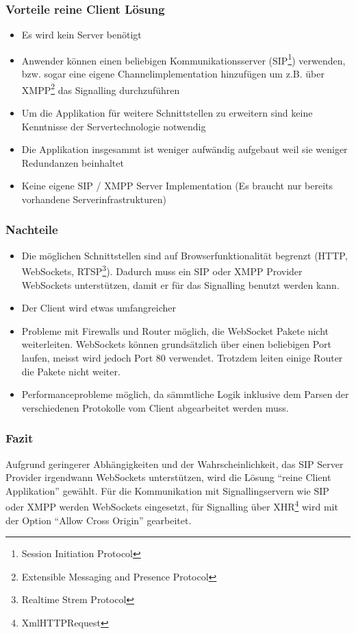 		\subsubsection{Vorteile reine Client Lösung}
		\begin{itemize}
			\item Es wird kein Server benötigt
			\item Anwender können einen beliebigen Kommunikationsserver (SIP\footnote{Session Initiation Protocol}) verwenden, bzw. sogar eine eigene Channelimplementation hinzufügen um z.B. über XMPP\footnote{Extensible Messaging and Presence Protocol} das Signalling durchzuführen
			\item Um die Applikation für weitere Schnittstellen zu erweitern sind keine Kenntnisse der Servertechnologie notwendig
			\item Die Applikation insgesammt ist weniger aufwändig aufgebaut weil sie weniger Redundanzen beinhaltet
			\item Keine eigene SIP / XMPP Server Implementation (Es braucht nur bereits vorhandene Serverinfrastrukturen)
		\end{itemize}
		\subsubsection{Nachteile}
		\begin{itemize}
			\item Die möglichen Schnittstellen sind auf Browserfunktionalität begrenzt (HTTP, WebSockets, RTSP\footnote{Realtime Strem Protocol}). Dadurch muss ein SIP oder XMPP Provider WebSockets unterstützen, damit er für das Signalling benutzt werden kann.
			\item Der Client wird etwas umfangreicher
			\item Probleme mit Firewalls und Router möglich, die WebSocket Pakete nicht weiterleiten. WebSockets können grundsätzlich über einen beliebigen Port laufen, meisst wird jedoch Port 80 verwendet. Trotzdem leiten einige Router die Pakete nicht weiter.
			\item Performanceprobleme möglich, da sämmtliche Logik inklusive dem Parsen der verschiedenen Protokolle vom Client abgearbeitet werden muss.
		\end{itemize}

		\subsubsection{Fazit}
			Aufgrund geringerer Abhängigkeiten und der Wahrscheinlichkeit, das SIP Server Provider irgendwann WebSockets unterstützen, wird die Lösung ``reine Client Applikation'' gewählt.
			Für die Kommunikation mit Signallingservern wie SIP oder XMPP werden WebSockets eingesetzt, für Signalling über XHR\footnote{XmlHTTPRequest} wird mit der Option ``Allow Cross Origin'' gearbeitet.

